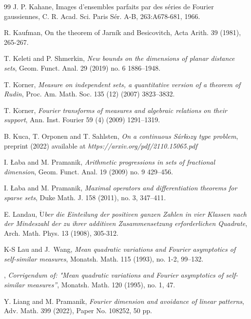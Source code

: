 \documentclass[a4paper,11pt]{amsart}
\numberwithin{equation}{section}
\begin{document}
\begin{thebibliography}{99}
 J. P. Kahane, Images d'ensembles parfaits par des s\'eries de Fourier gaussiennes,
C. R. Acad. Sci. Paris S\'er. A-B, 263:A678-681, 1966.

 R. Kaufman, On the theorem of Jarn\'ik and Besicovitch, Acta Arith. 39 (1981), 265-267.

 T. Keleti and P. Shmerkin, \textit{New bounds on the dimensions of planar distance sets}, Geom. Funct. Anal. 29 (2019) no. 6 1886–1948.

 T. K$\ddot{\text{o}}$rner, \textit{Measure on independent sets, a quantitative version of a theorem of Rudin}, Proc. Am. Math. Soc. 135 (12) (2007) 3823–3832. 

 T. K$\ddot{\text{o}}$rner, \textit{Fourier transforms of measures and algebraic relations on their support}, Ann. Inst. Fourier 59 (4) (2009) 1291–1319. 



 B. Kuca, T. Orponen and T. Sahlsten, \textit{On a continuous S\'ark$\ddot{\text{o}}$zy type problem}, preprint (2022) available at {\em{https://arxiv.org/pdf/2110.15065.pdf}}

 I. \L aba and M. Pramanik, \textit{Arithmetic progressions in sets of fractional dimension}, Geom. Funct. Anal. 19 (2009) no. 9 429--456.

 I. \L aba and M. Pramanik, \textit{Maximal operators and differentiation theorems for sparse sets},  Duke Math. J. 158 (2011), no. 3, 347–411.

 E. Landau, \textit{$\ddot{\text{U}}$ber die Einteilung der positiven ganzen Zahlen in vier Klassen nach der Mindeszahl der zu ihrer additiven Zusammensetzung erforderlichen Quadrate}, Arch. Math. Phys. 13 (1908), 305-312.

 K-S Lau and J.~Wang, \textit{Mean quadratic variations and Fourier asymptotics of self-similar measures},  Monatsh. Math. 115 (1993), no. 1-2, 99–132.

 \bysame,  \textit{Corrigendum of: "Mean quadratic variations and Fourier asymptotics of self-similar measures''}, Monatsh. Math. 120 (1995), no. 1, 47. 

 Y. Liang and M. Pramanik, \textit{Fourier dimension and avoidance of linear patterns},  Adv. Math. 399 (2022), Paper No. 108252, 50 pp.


\end{thebibliography}
\end{document}
